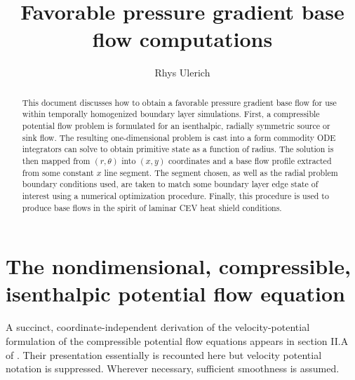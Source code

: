 \documentclass[letterpaper,11pt,nointlimits,reqno]{amsart}
\begin{document}
\title{Favorable pressure gradient base flow computations}
\author{Rhys Ulerich}

\begin{abstract}
This document discusses how to obtain a favorable pressure gradient base flow
for use within temporally homogenized boundary layer simulations.  First, a
compressible potential flow problem is formulated for an isenthalpic, radially
symmetric source or sink flow.  The resulting one-dimensional problem is cast
into a form commodity ODE integrators can solve to obtain primitive state as a
function of radius.  The solution is then mapped from $\left(r,\theta\right)$
into $\left(x,y\right)$ coordinates and a base flow profile extracted from some
constant $x$ line segment.  The segment chosen, as well as the radial problem
boundary conditions used, are taken to match some boundary layer edge state of
interest using a numerical optimization procedure.  Finally, this procedure is
used to produce base flows in the spirit of laminar CEV heat shield conditions.
\end{abstract}

\maketitle

\tableofcontents

\section{The nondimensional, compressible, isenthalpic potential flow equation}

A succinct, coordinate-independent derivation of the velocity-potential
formulation of the compressible potential flow equations appears in section
II.A of \citet{Saad2011Coordinate}.  Their presentation essentially is
recounted here but velocity potential notation is suppressed.  Wherever
necessary, sufficient smoothness is assumed.
\end{document}
